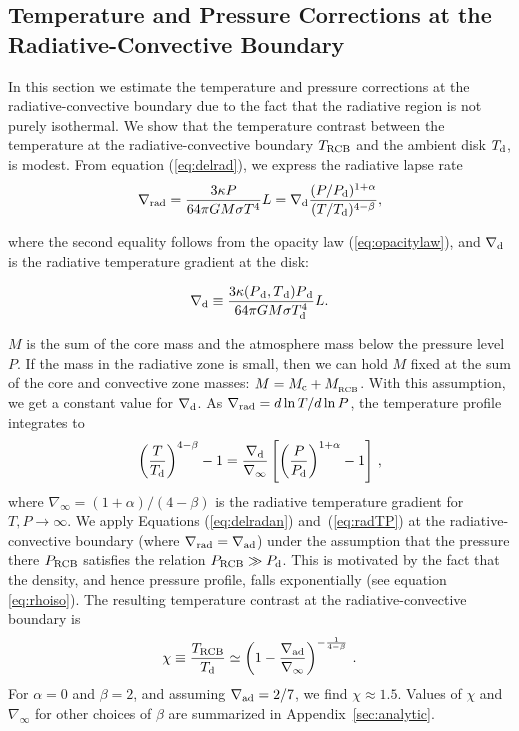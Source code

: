 \documentclass[apj]{emulateapj}
\newcommand{\delad}{\nabla_{\rm ad}}
\newcommand{\delrad}{\nabla_{\rm rad}}
\newcommand{\Eqs}[2]{Equations (\ref{#1}) and~(\ref{#2})}
\newcommand{\App}[1]{Appendix~\ref{#1}}
\newcommand{\co}{_{\rm c}}
\newcommand{\di}{_{\rm d}}
\newcommand{\cb}{_{\rm RCB}}
\begin{document}
\subsection{Temperature and Pressure Corrections at the Radiative-Convective Boundary}
\label{RCBcorr}

In this section we estimate the temperature and pressure corrections at the radiative-convective boundary due to the fact that the radiative region is not purely isothermal. We show that the temperature contrast between the temperature at the radiative-convective boundary $T_{\rm RCB}$ and the ambient disk $T_{\rm d}$, is modest.  From equation (\ref{eq:delrad}), we express the radiative lapse rate
\begin{equation}\label{eq:delradan}
\delrad = {3 \kappa P \over 64 \pi  G M \sigma T^4} L = \nabla\di {(P/P_{\rm d})^{1+\alpha} \over (T/T_{\rm d})^{4-\beta}},
\end{equation}

\noindent where the second equality follows from the opacity law (\ref{eq:opacitylaw}), and $\nabla_{\rm d}$ is the radiative temperature gradient at the disk:

\begin{equation}
\label{eq:delo}
\nabla \di \equiv \frac{3 \kappa(P{\di}, T{\di}) P{\di}}{64 \pi G M \sigma T_{\rm d}^4} L.
\end{equation}

\noindent $M$ is the sum of the core mass and the atmosphere mass below the pressure level $P$.  If the mass in the radiative zone is small, then we can hold $M$ fixed at the sum of the core and convective zone masses: $M = M\co + M_{\cb}$.   With this assumption, we get a constant value for $\nabla_{\rm d}$.  As $\delrad=d \ln T/d \ln P$, the temperature profile integrates to
\begin{equation}\label{eq:radTP}
\left(T \over T_{\rm d}\right)^{4-\beta} - 1 = {\nabla\di \over \nabla_\infty} \left[\left({P \over P_{\rm d}}\right)^{1+\alpha} - 1 \right] \, ,
\end{equation} 
where $\nabla_\infty = (1+\alpha)/(4-\beta)$ is the radiative temperature gradient for $T ,P \rightarrow \infty$.
We  apply \Eqs{eq:delradan}{eq:radTP} at the radiative-convective boundary (where $\delrad = \delad$) under the assumption that the pressure there $P\cb$ satisfies the relation $P\cb \gg P_{\rm d}$. This is motivated by the fact that the density, and hence pressure profile, falls exponentially (see equation \ref{eq:rhoiso}). The resulting temperature contrast at the radiative-convective boundary is
\begin{equation}\label{eq:Tcb}
\chi \equiv {T\cb\over T_{\rm d}} \simeq \left(1 - {\nabla_{\rm ad} \over \nabla_\infty}\right)^{-\frac{1}{4-\beta}} \, .
\end{equation} 
For  $\alpha=0$ and $\beta =2$,  and assuming $\delad = 2/7$, we find $\chi \approx 1.5$. Values of $\chi$ and $\nabla_\infty$ for other choices of $\beta$ are summarized in \App{sec:analytic}.
\end{document}
